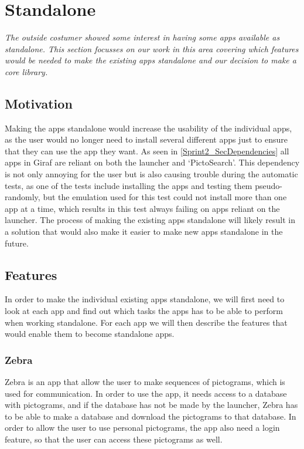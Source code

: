 \section{Standalone}
\textit{The outside costumer showed some interest in having some apps available as standalone. This section focusses on our work in this area covering which features would be needed to make the existing apps standalone and our decision to make a core library.}

\subsection{Motivation}
Making the apps standalone would increase the usability of the individual apps, as the user would no longer need to install several different apps just to ensure that they can use the app they want. As seen in \ref{Sprint2_SecDependencies} all apps in Giraf are reliant on both the launcher and ‘PictoSearch’. This dependency is not only annoying for the user but is also causing trouble during the automatic tests, as one of the tests include installing the apps and testing them pseudo-randomly, but the emulation used for this test could not install more than one app at a time, which results in this test always failing on apps reliant on the launcher. The process of making the existing apps standalone will likely result in a solution that would also make it easier to make new apps standalone in the future.

\subsection{Features}
In order to make the individual existing apps standalone, we will first need to look at each app and find out which tasks the apps has to be able to perform when working standalone. For each app we will then describe the features that would enable them to become standalone apps. 

\subsubsection{Zebra}
Zebra is an app that allow the user to make sequences of pictograms, which is used for communication. In order to use the app, it needs access to a database with pictograms, and if the database has not be made by the launcher, Zebra has to be able to make a database and download the pictograms to that database. In order to allow the user to use personal pictograms, the app also need a login feature, so that the user can access these pictograms as well.
